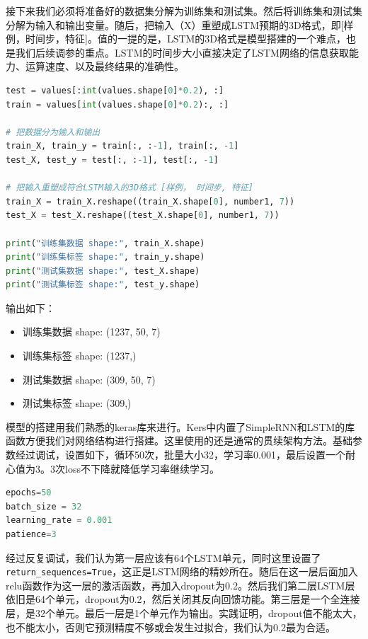 \documentclass[11pt,a4paper]{elegantpaper}
\begin{document}
\begin{multicols}{2}
接下来我们必须将准备好的数据集分解为训练集和测试集。然后将训练集和测试集分解为输入和输出变量。随后，把输入（X）重塑成LSTM预期的3D格式，即[样例，时间步，特征]。值的一提的是，LSTM的3D格式是模型搭建的一个难点，也是我们后续调参的重点。LSTM的时间步大小直接决定了LSTM网络的信息获取能力、运算速度、以及最终结果的准确性。

\begin{lstlisting}[language=Python]
test = values[:int(values.shape[0]*0.2), :]
train = values[int(values.shape[0]*0.2):, :]

# 把数据分为输入和输出
train_X, train_y = train[:, :-1], train[:, -1]
test_X, test_y = test[:, :-1], test[:, -1]

# 把输入重塑成符合LSTM输入的3D格式 [样例， 时间步, 特征]
train_X = train_X.reshape((train_X.shape[0], number1, 7))
test_X = test_X.reshape((test_X.shape[0], number1, 7))

print("训练集数据 shape:", train_X.shape)
print("训练集标签 shape:", train_y.shape)
print("测试集数据 shape:", test_X.shape)
print("测试集标签 shape:", test_y.shape)
\end{lstlisting}

输出如下：

\begin{itemize}
  \item 训练集数据 shape: (1237, 50, 7)
  \item 训练集标签 shape: (1237,)
  \item 测试集数据 shape: (309, 50, 7)
  \item 测试集标签 shape: (309,)
\end{itemize}


模型的搭建用我们熟悉的keras库来进行。Kers中内置了SimpleRNN和LSTM的库函数方便我们对网络结构进行搭建。这里使用的还是通常的贯续架构方法。基础参数经过调试，设置如下，循环50次，批量大小32，学习率0.001，最后设置一个耐心值为3。3次loss不下降就降低学习率继续学习。

\begin{lstlisting}[language=Python]
epochs=50
batch_size = 32
learning_rate = 0.001
patience=3
\end{lstlisting}

经过反复调试，我们认为第一层应该有64个LSTM单元，同时这里设置了\lstinline{return_sequences=True}，这正是LSTM网络的精妙所在。随后在这一层后面加入relu函数作为这一层的激活函数，再加入dropout为0.2。然后我们第二层LSTM层依旧是64个单元，dropout为0.2，然后关闭其反向回馈功能。第三层是一个全连接层，是32个单元。最后一层是1个单元作为输出。实践证明，dropout值不能太大，也不能太小，否则它预测精度不够或会发生过拟合，我们认为0.2最为合适。


\end{multicols}
\end{document}
